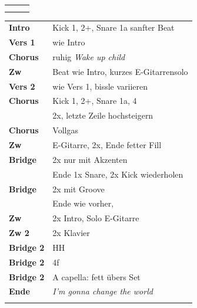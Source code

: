 

\begin{tabular}{p{0.6cm}p{12cm}p{1.4cm}}
	\rowcolor{cyan} \myRow{\thesongnumber} & \myRow{The Anthem} & \myRow{94} \\
	                                       &                 &             \\
\end{tabular}

\begin{tabular}{p{1.6cm}l}
	\textbf{Intro}  & Kick 1, 2+, Snare 1a sanfter Beat \\
	\textbf{Vers 1} & wie Intro \\
	\textbf{Chorus} & ruhig \textit{Wake up child} \\
	\textbf{Zw} 	& Beat wie Intro, kurzes E-Gitarrensolo \\
	\textbf{Vers 2} & wie Vers 1, bissle variieren \\
	\textbf{Chorus} & Kick 1, 2+, Snare 1a, 4 \\
					& 2x, letzte Zeile hochsteigern \\
	\textbf{Chorus} & Vollgas \\
	\textbf{Zw}		& E-Gitarre, 2x, Ende fetter Fill \\
	\textbf{Bridge} & 2x nur mit Akzenten \\
					& Ende 1x Snare, 2x Kick wiederholen \\
	\textbf{Bridge} & 2x mit Groove \\
					& Ende wie vorher,  \\
	\textbf{Zw}		& 2x Intro, Solo E-Gitarre \\
	\textbf{Zw 2}	& 2x \achtel Klavier \\
	\textbf{Bridge 2} & \viertel HH \\
	\textbf{Bridge 2} & 4f \\
	\textbf{Bridge 2} & A capella: fett übers Set \\
	\textbf{Ende} 	& \textit{I'm gonna change the world} \\
	 & \\
\end{tabular}
